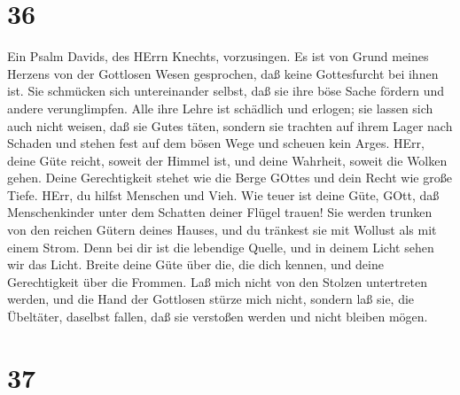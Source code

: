 \hypertarget{section-35}{%
\section{36}\label{section-35}}

 Ein Psalm Davids, des HErrn Knechts, vorzusingen.
 Es ist von Grund meines Herzens von der Gottlosen Wesen
gesprochen, daß keine Gottesfurcht bei ihnen ist.  Sie
schmücken sich untereinander selbst, daß sie ihre böse Sache fördern und
andere verunglimpfen.  Alle ihre Lehre ist schädlich und
erlogen; sie lassen sich auch nicht weisen, daß sie Gutes täten,
 sondern sie trachten auf ihrem Lager nach Schaden und
stehen fest auf dem bösen Wege und scheuen kein Arges. 
HErr, deine Güte reicht, soweit der Himmel ist, und deine Wahrheit,
soweit die Wolken gehen.  Deine Gerechtigkeit stehet wie die
Berge GOttes und dein Recht wie große Tiefe. HErr, du hilfst Menschen
und Vieh.  Wie teuer ist deine Güte, GOtt, daß
Menschenkinder unter dem Schatten deiner Flügel trauen!  Sie
werden trunken von den reichen Gütern deines Hauses, und du tränkest sie
mit Wollust als mit einem Strom.  Denn bei dir ist die
lebendige Quelle, und in deinem Licht sehen wir das Licht. 
Breite deine Güte über die, die dich kennen, und deine Gerechtigkeit
über die Frommen.  Laß mich nicht von den Stolzen
untertreten werden, und die Hand der Gottlosen stürze mich nicht,
 sondern laß sie, die Übeltäter, daselbst fallen, daß sie
verstoßen werden und nicht bleiben mögen.

\hypertarget{section-36}{%
\section{37}\label{section-36}}

